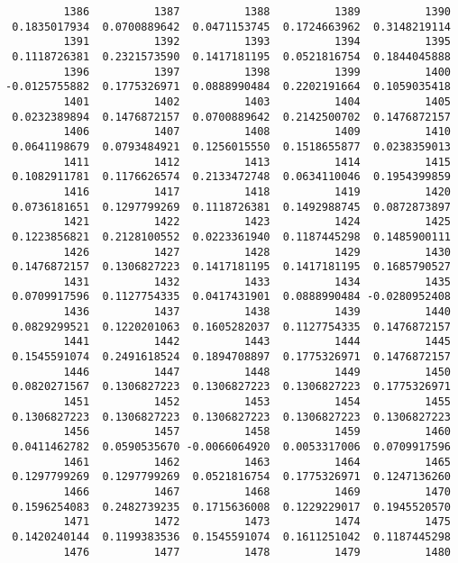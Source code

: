 \documentclass[
  letterpaper,
  DIV=11,
  numbers=noendperiod]{scrreprt}
\begin{document}
\begin{verbatim}
         1386          1387          1388          1389          1390 
 0.1835017934  0.0700889642  0.0471153745  0.1724663962  0.3148219114 
         1391          1392          1393          1394          1395 
 0.1118726381  0.2321573590  0.1417181195  0.0521816754  0.1844045888 
         1396          1397          1398          1399          1400 
-0.0125755882  0.1775326971  0.0888990484  0.2202191664  0.1059035418 
         1401          1402          1403          1404          1405 
 0.0232389894  0.1476872157  0.0700889642  0.2142500702  0.1476872157 
         1406          1407          1408          1409          1410 
 0.0641198679  0.0793484921  0.1256015550  0.1518655877  0.0238359013 
         1411          1412          1413          1414          1415 
 0.1082911781  0.1176626574  0.2133472748  0.0634110046  0.1954399859 
         1416          1417          1418          1419          1420 
 0.0736181651  0.1297799269  0.1118726381  0.1492988745  0.0872873897 
         1421          1422          1423          1424          1425 
 0.1223856821  0.2128100552  0.0223361940  0.1187445298  0.1485900111 
         1426          1427          1428          1429          1430 
 0.1476872157  0.1306827223  0.1417181195  0.1417181195  0.1685790527 
         1431          1432          1433          1434          1435 
 0.0709917596  0.1127754335  0.0417431901  0.0888990484 -0.0280952408 
         1436          1437          1438          1439          1440 
 0.0829299521  0.1220201063  0.1605282037  0.1127754335  0.1476872157 
         1441          1442          1443          1444          1445 
 0.1545591074  0.2491618524  0.1894708897  0.1775326971  0.1476872157 
         1446          1447          1448          1449          1450 
 0.0820271567  0.1306827223  0.1306827223  0.1306827223  0.1775326971 
         1451          1452          1453          1454          1455 
 0.1306827223  0.1306827223  0.1306827223  0.1306827223  0.1306827223 
         1456          1457          1458          1459          1460 
 0.0411462782  0.0590535670 -0.0066064920  0.0053317006  0.0709917596 
         1461          1462          1463          1464          1465 
 0.1297799269  0.1297799269  0.0521816754  0.1775326971  0.1247136260 
         1466          1467          1468          1469          1470 
 0.1596254083  0.2482739235  0.1715636008  0.1229229017  0.1945520570 
         1471          1472          1473          1474          1475 
 0.1420240144  0.1199383536  0.1545591074  0.1611251042  0.1187445298 
         1476          1477          1478          1479          1480 

\end{verbatim}
\end{document}
